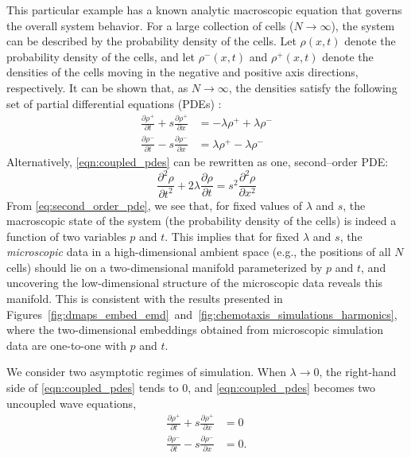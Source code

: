 \documentclass[preprint]{elsarticle}
\begin{document}
This particular example has a known analytic macroscopic equation that governs the overall system behavior.
%
For a large collection of cells ($N \rightarrow \infty$), the system can be described by the probability density of the cells.
%
Let $\rho(x, t)$ denote the probability density of the cells, and let $\rho^-(x, t)$ and $\rho^+(x, t)$ denote the densities of the cells moving in the negative and positive axis directions, respectively.
%
It can be shown that, as $N \rightarrow \infty$, the densities satisfy the following set of partial differential equations (PDEs) \cite{othmer2000diffusion}:
\begin{equation} \label{eqn:coupled_pdes}
\begin{aligned}
\frac{\partial \rho^+}{\partial t} + s \frac{\partial \rho^+}{\partial x} & = -\lambda \rho^+ +\lambda \rho^- \\
\frac{\partial \rho^-}{\partial t} - s \frac{\partial \rho^-}{\partial x} & = \lambda \rho^+ -\lambda \rho^- 
\end{aligned}
\end{equation}
%
Alternatively, \eqref{eqn:coupled_pdes} can be rewritten as one, second--order PDE:
\begin{equation} \label{eq:second_order_pde}
\frac{\partial^2 \rho}{\partial t^2} + 2 \lambda \frac{\partial \rho}{\partial t} = s^2 \frac{\partial ^2 \rho}{\partial x^2}
\end{equation}
%
%
From \eqref{eq:second_order_pde}, we see that, for fixed values of $\lambda$ and $s$, the macroscopic state of the system (the probability density of the cells) is indeed a function of two variables $p$ and $t$. 
%
This implies that for fixed $\lambda$ and $s$, the {\em microscopic} data in a high-dimensional ambient space (e.g., the positions of all $N$ cells) should lie on a two-dimensional manifold parameterized by $p$ and $t$, 
and uncovering the low-dimensional structure of the microscopic data reveals this manifold.
%
This is consistent with the results presented in Figures~\ref{fig:dmaps_embed_emd}~and~\ref{fig:chemotaxis_simulations_harmonics}, where the two-dimensional embeddings obtained from microscopic simulation data are one-to-one with $p$ and $t$.

We consider two asymptotic regimes of simulation.
%
When $\lambda \rightarrow 0$, the right-hand side of \eqref{eqn:coupled_pdes} tends to 0, and \eqref{eqn:coupled_pdes} becomes two uncoupled wave equations,
\begin{equation}
\begin{aligned}
\frac{\partial \rho^+}{\partial t} + s \frac{\partial \rho^+}{\partial x} & = 0 \\
\frac{\partial \rho^-}{\partial t} - s \frac{\partial \rho^-}{\partial x} & = 0.
\end{aligned}
\end{equation}
\end{document}
